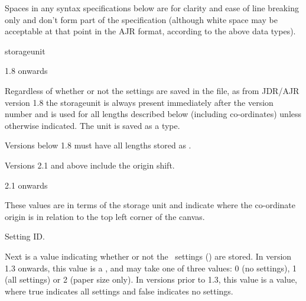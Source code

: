 \begin{important}
Spaces in any syntax specifications below are for clarity and ease
of line breaking only and don't form part of the specification
(although white space may be acceptable at that point in the
\gls{AJR} format, according to the above data types).
\end{important}

\begin{numbered}

\item \label{jdr:storageunit}\Gls{storageunit}
\begin{jdrversion}{1.8 onwards}
\begin{syntaxline}
\end{syntaxline}
\end{jdrversion}
Regardless of whether or not the settings are saved in the file, as
from JDR/AJR version 1.8 the \gls{storageunit}  is
always present immediately after the version number and is used for
all lengths described below (including \glspl{co-ordinate}) unless
otherwise indicated. The unit is saved as a  type.

Versions below 1.8 must have all lengths stored as
.

\item Versions 2.1 and above include the origin shift.
\begin{jdrversion}{2.1 onwards}
\begin{syntaxline}
 
\end{syntaxline}
\end{jdrversion}
These values are in terms of the storage unit and indicate where the
co-ordinate origin is in relation to the top left corner of the
\gls{canvas}.

\item\label{jdr:settings-id}Setting ID.
\begin{syntaxline}
\end{syntaxline}
Next is a value  indicating whether or not the
\FlowframTk\ settings () are
stored.
In version 1.3 onwards, this value is a , and may take one of three
values: 0 (no settings), 1 (all settings) or 2 (paper size only).
In versions prior to 1.3, this value is a  value,
where true indicates all settings and false indicates no settings.


\end{numbered}
